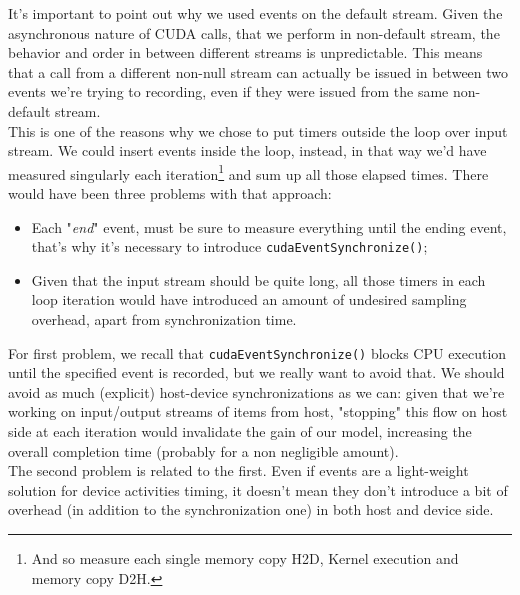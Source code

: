 It's important to point out why we used events on the default stream. 
Given the asynchronous nature of CUDA calls, that we perform in non-default stream, the behavior and order in between different streams is unpredictable. This means that a call from a different non-null stream can actually be issued in between two events we're trying to recording, even if they were issued from the same non-default stream.\\
This is one of the reasons why we chose to put timers outside the loop over input stream.
We could insert events inside the loop, instead, in that way we'd have measured singularly each iteration\footnote{And so measure each single memory copy H2D, Kernel execution and memory copy D2H.} and sum up all those elapsed times.
There would have been three problems with that approach:
\begin{itemize}
	\item Each "\textit{end}" event, must be sure to measure everything until the ending event, that's why it's necessary to introduce \texttt{cudaEventSynchronize()};
	\item Given that the input stream should be quite long, all those timers in each loop iteration would have introduced an amount of undesired sampling overhead, apart from synchronization time.
\end{itemize}

For first problem, we recall that \texttt{cudaEventSynchronize()} blocks CPU execution until the specified event is recorded, but we really want to avoid that.
We should avoid as much (explicit) host-device synchronizations as we can: given that we're working on input/output streams of items from host, "stopping" this flow on host side at each iteration would invalidate the gain of our model, increasing the overall completion time (probably for a non negligible amount).\\
The second problem is related to the first. Even if events are a light-weight solution for device activities timing, it doesn't mean they don't introduce a bit of overhead (in addition to the synchronization one) in both host and device side.

